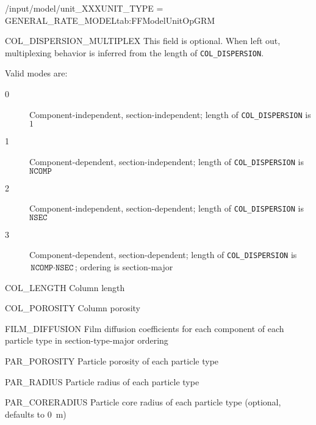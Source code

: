 \begin{condsubgroup}{/input/model/unit\_XXX}{UNIT\_TYPE = GENERAL\_RATE\_MODEL}{tab:FFModelUnitOpGRM}
\begin{dataset}[unit=--,type=int,range={$\{0, \dots, 3 \}$},length={1}]{COL\_DISPERSION\_MULTIPLEX}
    This field is optional.
    When left out, multiplexing behavior is inferred from the length of \texttt{COL\_DISPERSION}.

    Valid modes are:
    \begin{description}
      \item[0] Component-independent, section-independent; length of \texttt{COL\_DISPERSION} is $1$
      \item[1] Component-dependent, section-independent; length of \texttt{COL\_DISPERSION} is $\texttt{NCOMP}$
      \item[2] Component-independent, section-dependent; length of \texttt{COL\_DISPERSION} is $\texttt{NSEC}$
      \item[3] Component-dependent, section-dependent; length of \texttt{COL\_DISPERSION} is $\texttt{NCOMP} \cdot \texttt{NSEC}$; ordering is section-major
    \end{description}\vspace{-\baselineskip}
  \end{dataset}
  \begin{dataset}[unit=\si{\metre},type=double,range={$> 0$},length={1}]{COL\_LENGTH}
    Column length
  \end{dataset}
  \begin{dataset}[unit=--,type=double,range={$[0,1]$},length={1}]{COL\_POROSITY}
    Column porosity
  \end{dataset}
  \begin{dataset}[unit=\si{\metre\per\second},type=double,range={$\geq 0$},length={$\texttt{NPARTYPE} \cdot \texttt{NCOMP}$ / $\texttt{NPARTYPE} \cdot \texttt{NCOMP} \cdot \texttt{NSEC}$}]{FILM\_DIFFUSION}
    Film diffusion coefficients for each component of each particle type in section-type-major ordering
  \end{dataset}
  \begin{dataset}[unit=--,type=double,range={$[0,1]$},length={\texttt{NPARTYPE}}]{PAR\_POROSITY}
    Particle porosity of each particle type
  \end{dataset}
  \begin{dataset}[unit=\si{\metre},type=double,range={$>0$},length={\texttt{NPARTYPE}}]{PAR\_RADIUS}
    Particle radius of each particle type
  \end{dataset}
  \begin{dataset}[unit=\si{\metre},type=double,range={$[0, \texttt{PAR\_RADIUS})$},length={\texttt{NPARTYPE}}]{PAR\_CORERADIUS}
    Particle core radius of each particle type (optional, defaults to \SI{0}{\metre})

\end{dataset}
\end{condsubgroup}
